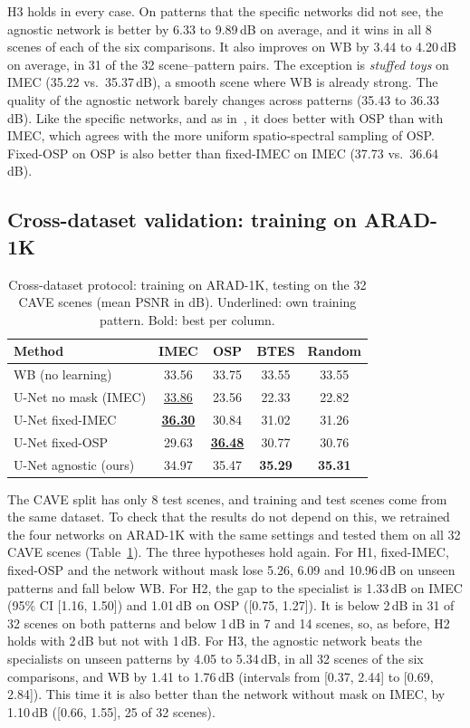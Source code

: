 \documentclass{article}
\newcommand{\seen}[1]{\underline{#1}}
\begin{document}
H3 holds in every case. On patterns that the specific networks did not see,
the agnostic network is better by 6.33 to 9.89\,dB on average, and it wins
in all 8 scenes of each of the six comparisons. It also improves on WB by
3.44 to 4.20\,dB on average, in 31 of the 32 scene--pattern pairs. The
exception is \textit{stuffed toys} on IMEC (35.22 vs.\ 35.37\,dB), a smooth
scene where WB is already strong. The quality of the agnostic network barely
changes across patterns (35.43 to 36.33\,dB). Like the specific networks,
and as in~\cite{diaz2023}, it does better with OSP than with IMEC, which
agrees with the more uniform spatio-spectral sampling of OSP. Fixed-OSP on
OSP is also better than fixed-IMEC on IMEC (37.73 vs.\ 36.64\,dB).

\subsection{Cross-dataset validation: training on ARAD-1K}
\label{sec:cross}

\begin{table}[t]
\centering
\caption{Cross-dataset protocol: training on ARAD-1K, testing on the 32 CAVE
scenes (mean PSNR in dB). Underlined: own training pattern. Bold: best per
column.}
\label{tab:arad}
\footnotesize
\setlength{\tabcolsep}{3.5pt}
\begin{tabular}{|l|c|c|c|c|}
\hline
Method & IMEC & OSP & BTES & Random \\
\hline
WB (no learning)      & 33.56 & 33.75 & 33.55 & 33.55 \\
U-Net no mask (IMEC)  & \seen{33.86} & 23.56 & 22.33 & 22.82 \\
U-Net fixed-IMEC      & \seen{\textbf{36.30}} & 30.84 & 31.02 & 31.26 \\
U-Net fixed-OSP       & 29.63 & \seen{\textbf{36.48}} & 30.77 & 30.76 \\
U-Net agnostic (ours) & 34.97 & 35.47 & \textbf{35.29} & \textbf{35.31} \\
\hline
\end{tabular}
\end{table}

The CAVE split has only 8 test scenes, and training and test scenes come
from the same dataset. To check that the results do not depend on this, we
retrained the four networks on ARAD-1K with the same settings and tested
them on all 32 CAVE scenes (Table~\ref{tab:arad}). The three hypotheses hold
again. For H1, fixed-IMEC, fixed-OSP and the network without mask lose
5.26, 6.09 and 10.96\,dB on unseen patterns and fall below WB. For H2, the
gap to the specialist is 1.33\,dB on IMEC (95\% CI [1.16, 1.50]) and
1.01\,dB on OSP ([0.75, 1.27]). It is below 2\,dB in 31 of 32 scenes on both
patterns and below 1\,dB in 7 and 14 scenes, so, as before, H2 holds with
2\,dB but not with 1\,dB. For H3, the agnostic network beats the specialists
on unseen patterns by 4.05 to 5.34\,dB, in all 32 scenes of the six
comparisons, and WB by 1.41 to 1.76\,dB (intervals from [0.37, 2.44] to
[0.69, 2.84]). This time it is also better than the network without mask on
IMEC, by 1.10\,dB ([0.66, 1.55], 25 of 32 scenes).
\end{document}
